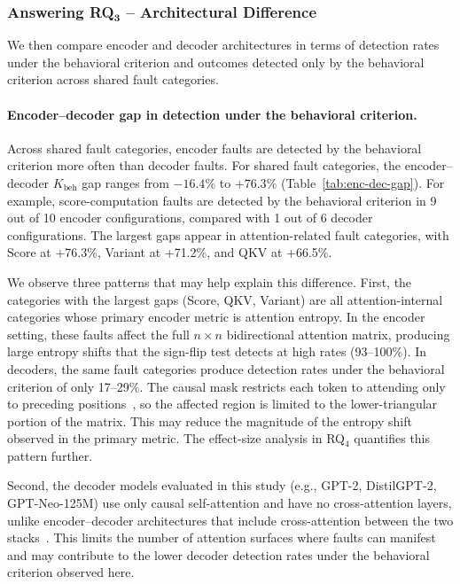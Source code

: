 \subsubsection{\textbf{Answering RQ$\mathbf{_3}$} -- Architectural Difference}

We then compare encoder and decoder architectures in terms of detection rates under the behavioral criterion and outcomes detected only by the behavioral criterion across shared fault categories.

\paragraph{Encoder--decoder gap in detection under the behavioral criterion.}
Across shared fault categories, encoder faults are detected by the behavioral criterion more often than decoder faults. For shared fault categories, the encoder--decoder $K_{\text{beh}}$ gap ranges from $-16.4$\% to $+76.3$\% (Table~\ref{tab:enc-dec-gap}). For example, score-computation faults are detected by the behavioral criterion in 9 out of 10 encoder configurations, compared with 1 out of 6 decoder configurations. The largest gaps appear in attention-related fault categories, with Score at +76.3\%, Variant at +71.2\%, and QKV at +66.5\%.

We observe three patterns that may help explain this difference. First, the categories with the largest gaps (Score, QKV, Variant) are all attention-internal categories whose primary encoder metric is attention entropy. In the encoder setting, these faults affect the full $n \times n$ bidirectional attention matrix, producing large entropy shifts that the sign-flip test detects at high rates (93--100\%). In decoders, the same fault categories produce detection rates under the behavioral criterion of only 17--29\%. The causal mask restricts each token to attending only to preceding positions~\citep{vaswani2017attention}, so the affected region is limited to the lower-triangular portion of the matrix. This may reduce the magnitude of the entropy shift observed in the primary metric. The effect-size analysis in RQ$_4$ quantifies this pattern further.

Second, the decoder models evaluated in this study (e.g., GPT-2, DistilGPT-2, GPT-Neo-125M) use only causal self-attention and have no cross-attention layers, unlike encoder--decoder architectures that include cross-attention between the two stacks~\citep{vaswani2017attention}. This limits the number of attention surfaces where faults can manifest and may contribute to the lower decoder detection rates under the behavioral criterion observed here.

